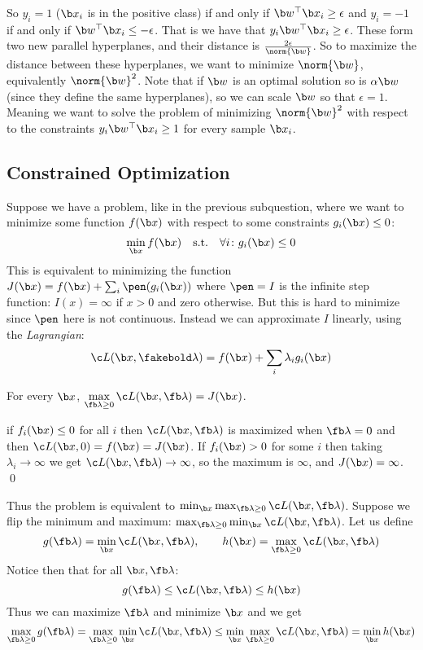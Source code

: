 So $y_i=1$ ($\b x_i$ is in the positive class) if and only if $\b w^\top\b x_i\geq\epsilon$ and $y_i=-1$ if and only if $\b w^\top\b x_i\leq-\epsilon$.
That is we have that $y_i\b w^\top\b x_i\geq\epsilon$.
These form two new parallel hyperplanes, and their distance is $\frac{2\epsilon}{\norm{\b w}}$.
So to maximize the distance between these hyperplanes, we want to minimize $\norm{\b w}$, equivalently $\norm{\b w}^2$.
Note that if $\b w$ is an optimal solution so is $\alpha\b w$ (since they define the same hyperplanes), so we can scale $\b w$ so that $\epsilon=1$.
Meaning we want to solve the problem of minimizing $\norm{\b w}^2$ with respect to the constraints $y_i\b w^\top\b x_i\geq1$ for every sample $\b x_i$.

\subsection{Constrained Optimization}

Suppose we have a problem, like in the previous subquestion, where we want to minimize some function $f(\b x)$ with respect to some constraints $g_i(\b x)\leq0$:
$$ \min_{\b x}f(\b x) \hbox{\quad s.t.\quad} \forall i\colon g_i(\b x)\leq 0 $$
This is equivalent to minimizing the function $J(\b x)=f(\b x) + \sum_i\pen(g_i(\b x))$ where $\pen=I$ is the infinite step function: $I(x)=\infty$ if $x>0$ and zero otherwise.
But this is hard to minimize since $\pen$ here is not continuous.
Instead we can approximate $I$ linearly, using the {\it Lagrangian}:
$$ \c L(\b x,\fakebold\lambda) = f(\b x) + \sum_i\lambda_ig_i(\b x) $$

\bprop

    For every $\b x$, $\max\limits_{\fb\lambda\geq0}\c L(\b x,\fb\lambda)=J(\b x)$.

\eprop

\Proof if $f_i(\b x)\leq0$ for all $i$ then $\c L(\b x,\fb\lambda)$ is maximized when $\fb\lambda=0$ and then $\c L(\b x,0)=f(\b x)=J(\b x)$.
If $f_i(\b x)>0$ for some $i$ then taking $\lambda_i\to\infty$ we get $\c L(\b x,\fb\lambda)\to\infty$, so the maximum is $\infty$, and $J(\b x)=\infty$.
\qed

Thus the problem is equivalent to $\min_{\b x}\max_{\fb\lambda\geq0}\c L(\b x,\fb\lambda)$.
Suppose we flip the minimum and maximum: $\max_{\fb\lambda\geq0}\min_{\b x}\c L(\b x,\fb\lambda)$.
Let us define
$$ g(\fb\lambda) = \min_{\b x}\c L(\b x,\fb\lambda),\qquad h(\b x) = \max_{\fb\lambda\geq0}\c L(\b x,\fb\lambda) $$
Notice then that for all $\b x,\fb\lambda$:
$$ g(\fb\lambda) \leq \c L(\b x,\fb\lambda) \leq h(\b x) $$
Thus we can maximize $\fb\lambda$ and minimize $\b x$ and we get
$$ \max_{\fb\lambda\geq0}g(\fb\lambda) = \max_{\fb\lambda\geq0}\min_{\b x}\c L(\b x,\fb\lambda) \leq \min_{\b x}\max_{\fb\lambda\geq0}\c L(\b x,\fb\lambda) = \min_{\b x}h(\b x) $$

